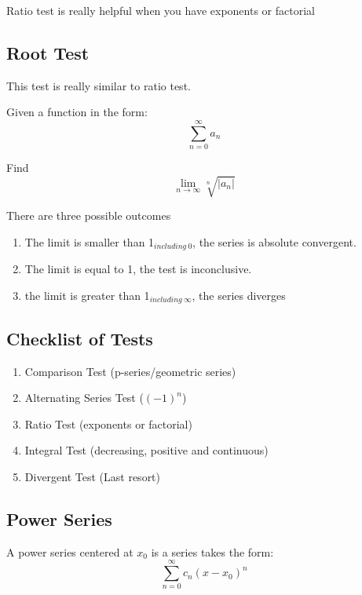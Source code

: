 	Ratio test is really helpful when you have exponents or factorial
	
	\subsection{Root Test}
	
	This test is really similar to ratio test.
	
	\begin{theorem}{}{}
	    Given a function in the form:
	    $$\sum^\infty_{n=0}a_n$$
	    
	    Find 
	    \begin{equation}
	        \lim_{n\to\infty}\sqrt[n]{\left|a_n\right|}
	    \end{equation}
	    
	    There are three possible outcomes
        \begin{enumerate}
            \item The limit is smaller than 1$_{including\ 0}$, the series is absolute convergent.
            \item The limit is equal to 1, the test is inconclusive.
            \item the limit is greater than 1$_{including\ \infty}$, the series diverges
        \end{enumerate}
	\end{theorem}
	
	\subsection{Checklist of Tests}
	\begin{enumerate}
	    \item Comparison Test (p-series/geometric series)
	    \item Alternating Series Test ($(-1)^n$)
	    \item Ratio Test (exponents or factorial)
	    \item Integral Test (decreasing, positive and continuous)
	    \item Divergent Test (Last resort)
	\end{enumerate}
	
	\subsection{Power Series}
	\begin{theorem}{}{}
	A power series centered at $x_0$ is a series takes the form:
	\begin{equation}
	    \sum^\infty_{n=0}c_n(x-x_0)^n
	\end{equation}
	\end{theorem}
	
